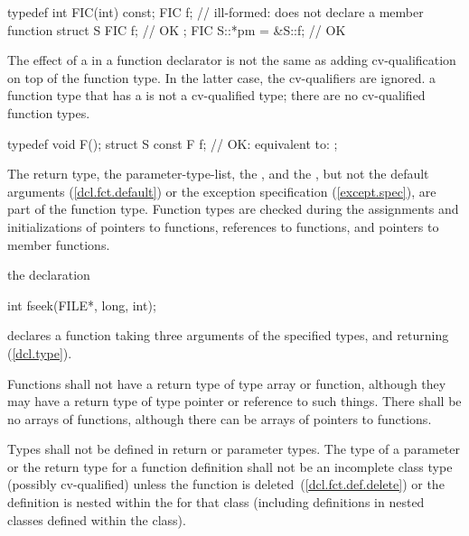 \begin{codeblock}
typedef int FIC(int) const;
FIC f;              // ill-formed: does not declare a member function
struct S {
  FIC f;            // OK
};
FIC S::*pm = &S::f; // OK
\end{codeblock}
\exitexample

The effect of a
in a function declarator is not the same as
adding cv-qualification on top of the function type.
In the latter case, the cv-qualifiers are ignored.
\enternote a function type that has a  is not a
cv-qualified type; there are no cv-qualified function types. \exitnote
\enterexample

\begin{codeblock}
typedef void F();
struct S {
  const F f;        // OK: equivalent to: 
};
\end{codeblock}
\exitexample
The return type, the parameter-type-list, the , and the
,
but not the default arguments (\ref{dcl.fct.default})
or the exception specification (\ref{except.spec}),
are part of the function type.
\enternote
Function types are checked during the assignments and initializations of
pointers to functions, references to functions, and pointers to member functions.
\exitnote

\pnum
\enterexample
{}%
the declaration

\begin{codeblock}
int fseek(FILE*, long, int);
\end{codeblock}

declares a function taking three arguments of the specified types,
and returning
(\ref{dcl.type}).
\exitexample

\pnum
{}%
%
Functions shall not have a return type of type array or function,
although they may have a return type of type pointer or reference to such things.
There shall be no arrays of functions, although there can be arrays of pointers
to functions.

\pnum
Types shall not be defined in return or parameter types.
The type of a parameter or the return type for a function
definition shall not be an incomplete class type (possibly
cv-qualified) unless the function is
deleted~(\ref{dcl.fct.def.delete}) or the definition is nested
within the
for that class (including definitions in nested classes
defined within the class).


